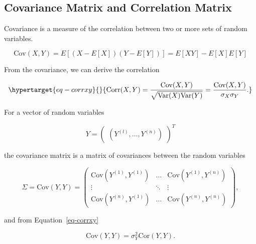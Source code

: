 \documentclass[
  letterpaper,
  DIV=11,
  numbers=noendperiod]{scrreprt}
\begin{document}
\hypertarget{covariance-matrix-and-correlation-matrix}{%
\subsection{Covariance Matrix and Correlation
Matrix}\label{covariance-matrix-and-correlation-matrix}}

\begin{tcolorbox}[enhanced jigsaw, opacityback=0, left=2mm, title=\textcolor{quarto-callout-note-color}{\faInfo}\hspace{0.5em}{Covariance and Correlation (taken from @Forr08a)}, bottomrule=.15mm, titlerule=0mm, arc=.35mm, leftrule=.75mm, colbacktitle=quarto-callout-note-color!10!white, bottomtitle=1mm, opacitybacktitle=0.6, coltitle=black, colframe=quarto-callout-note-color-frame, toprule=.15mm, breakable, colback=white, toptitle=1mm, rightrule=.15mm]

Covariance is a measure of the correlation between two or more sets of
random variables.

\[
\text{Cov}(X,Y) = E[(X - E[X])(Y - E[Y])] = E[XY] - E[X]E[Y]
\]

From the covariance, we can derive the correlation

\begin{equation}\protect\hypertarget{eq-corrxy}{}{
\text{Corr}(X,Y) = \frac{\text{Cov}(X,Y)}{\sqrt{\text{Var}(X)\text{Var}(Y)}} = \frac{\text{Cov}(X,Y)}{\sigma_X\sigma_Y}.
}\label{eq-corrxy}\end{equation}

For a vector of random variables

\[
Y = 
\begin{pmatrix}
(Y^{(l)}, \ldots, Y^{(n)})
\end{pmatrix}^T
\]

the covariance matrix is a matrix of covariances between the random
variables

\[
\Sigma =
\text{Cov}(Y, Y) =
\begin{pmatrix}
\text{Cov}(Y^{(1)}, Y^{(1)}) & \ldots & \text{Cov}(Y^{(1)}, Y^{(n)}) \\
\vdots & \ddots & \vdots \\
\text{Cov}(Y^{(n)}, Y^{(1)}) & \ldots & \text{Cov}(Y^{(n)}, Y^{(n)})
\end{pmatrix},
\]

and from Equation~\ref{eq-corrxy}

\[
\text{Cov}(Y, Y) = \sigma_Y^2 \text{Cor}(Y, Y).
\]

\end{tcolorbox}
\end{document}
